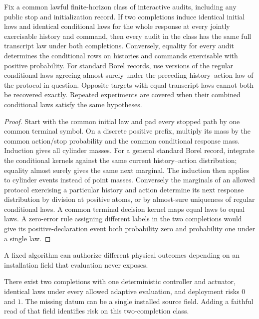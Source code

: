 \begin{theorem}\label{thm:t15}

Fix a common lawful finite-horizon class of interactive audits, including any public stop and initialization record. If two completions induce identical initial laws and identical conditional laws for the whole response at every jointly exercisable history and command, then every audit in the class has the same full transcript law under both completions. Conversely, equality for every audit determines the conditional rows on histories and commands exercisable with positive probability. For standard Borel records, use versions of the regular conditional laws agreeing almost surely under the preceding history--action law of the protocol in question. Opposite targets with equal transcript laws cannot both be recovered exactly. Repeated experiments are covered when their combined conditional laws satisfy the same hypotheses.

\end{theorem}

\begin{proof}

Start with the common initial law and pad every stopped path by one common terminal symbol. On a discrete positive prefix, multiply its mass by the common action/stop probability and the common conditional response mass. Induction gives all cylinder masses. For a general standard Borel record, integrate the conditional kernels against the same current history--action distribution; equality almost surely gives the same next marginal. The induction then applies to cylinder events instead of point masses. Conversely the marginals of an allowed protocol exercising a particular history and action determine its next response distribution by division at positive atoms, or by almost-sure uniqueness of regular conditional laws. A common terminal decision kernel maps equal laws to equal laws. A zero-error rule assigning different labels in the two completions would give its positive-declaration event both probability zero and probability one under a single law.

\end{proof}

A fixed algorithm can authorize different physical outcomes depending on an installation field that evaluation never exposes.

\begin{theorem}\label{thm:t16}

There exist two completions with one deterministic controller and actuator, identical laws under every allowed adaptive evaluation, and deployment risks \(0\) and \(1\). The missing datum can be a single installed source field. Adding a faithful read of that field identifies risk on this two-completion class.

\end{theorem}

